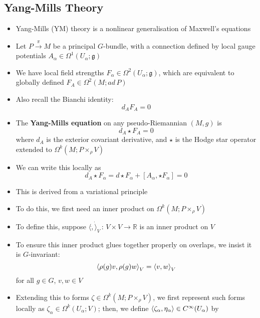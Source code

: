 \documentclass[12pt,a4paper]{article}
\numberwithin{equation}{section}
\begin{document}
	\subsection{Yang-Mills Theory}
	\begin{itemize}
		\item Yang-Mills (YM) theory is a nonlinear generalisation of Maxwell's equations
		\item Let $P\xrightarrow{\pi}M$ be a principal $G$-bundle, with a connection defined by local gauge potentials $A_{\alpha}\in\Omega^{1}(U_{\alpha};\mathfrak{g})$
		\item We have local field strengths $F_{\alpha}\in\Omega^{2}(U_{\alpha};\mathfrak{g})$, which are equivalent to globally defined $F_{A}\in\Omega^{2}(M;ad\,P)$
		\item Also recall the Bianchi identity:
		\begin{equation}
			d_{A}F_{A}=0
		\end{equation}
		\item The \textbf{Yang-Mills equation} on any pseudo-Riemannian $(M,g)$ is
		\begin{equation}
			d_{A}\star F_{A}=0
		\end{equation}
		where $d_{A}$ is the exterior covariant derivative, and $\star$ is the Hodge star operator extended to $\Omega^{k}(M;P\times_{\rho}V)$
		\item We can write this locally as
		\begin{equation}
			d_{A}\star F_{\alpha}=d\star F_{\alpha}+[A_{\alpha},\star F_{\alpha}]=0
		\end{equation}
		\item This is derived from a variational principle
		\item To do this, we first need an inner product on $\Omega^{k}(M;P\times_{\rho}V)$
		\item To define this, suppose $\langle\dot,\dot\rangle_{V}\,:\,V\times V\to\mathbb{R}$ is an inner product on $V$
		\item To ensure this inner product glues together properly on overlaps, we insist it is $G$-invariant:
		\begin{equation}
			\braket{\rho(g)v,\rho(g)w}_{V}=\braket{v,w}_{V}
		\end{equation}
		for all $g\in G$, $v,w\in V$
		\item Extending this to forms $\zeta\in\Omega^{k}(M;P\times_{\rho}V)$, we first represent such forms locally as $\zeta_{\alpha}\in\Omega^{k}(U_{\alpha};V)$; then, we define $\braket{\zeta_{\alpha},\eta_{\alpha}}\in C^{\infty}(U_{\alpha})$ by

\end{itemize}
\end{document}
